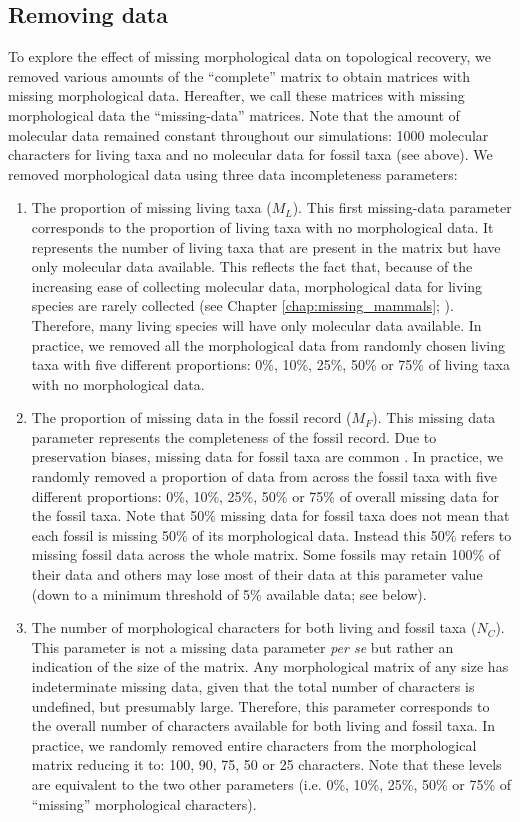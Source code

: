 \subsection{Removing data}
To explore the effect of missing morphological data on topological recovery, we removed various amounts of the ``complete'' matrix to obtain matrices with missing morphological data.
Hereafter, we call these matrices with missing morphological data the ``missing-data'' matrices.
Note that the amount of molecular data remained constant throughout our simulations: 1000 molecular characters for living taxa and no molecular data for fossil taxa (see above).
We removed morphological data using three data incompleteness parameters:
\begin{enumerate}
\item{The proportion of missing living taxa ($M_L$).}
This first missing-data parameter corresponds to the proportion of living taxa with no morphological data. It represents the number of living taxa that are present in the matrix but have only molecular data available. This reflects the fact that, because of the increasing ease of collecting molecular data, morphological data for living species are rarely collected (see Chapter \ref{chap:missing_mammals}; \citealt{GuillermeCooperMissing}).
Therefore, many living species will have only molecular data available.
In practice, we removed all the morphological data from randomly chosen living taxa with five different proportions: 0\%, 10\%, 25\%, 50\% or 75\% of living taxa with no morphological data.
\item{The proportion of missing data in the fossil record ($M_F$).}
This missing data parameter represents the completeness of the fossil record.
Due to preservation biases, missing data for fossil taxa are common \citep{sansomfossilization2013}.
In practice, we randomly removed a proportion of data from across the fossil taxa with five different proportions: 0\%, 10\%, 25\%, 50\% or 75\% of overall missing data for the fossil taxa.
Note that 50\% missing data for fossil taxa does not mean that each fossil is missing 50\% of its morphological data.
Instead this 50\% refers to missing fossil data across the whole matrix.
Some fossils may retain 100\% of their data and others may lose most of their data at this parameter value (down to a minimum threshold of 5\% available data; see below).
\item{The number of morphological characters for both living and fossil taxa ($N_C$).}
This parameter is not a missing data parameter \textit{per se} but rather an indication of the size of the matrix.
Any morphological matrix of any size has indeterminate missing data, given that the total number of characters is undefined, but presumably large.
Therefore, this parameter corresponds to the overall number of characters available for both living and fossil taxa.
In practice, we randomly removed entire characters from the morphological matrix reducing it to: 100, 90, 75, 50 or 25 characters.
Note that these levels are equivalent to the two other parameters (i.e. 0\%, 10\%, 25\%, 50\% or 75\% of ``missing'' morphological characters).
\end{enumerate}

